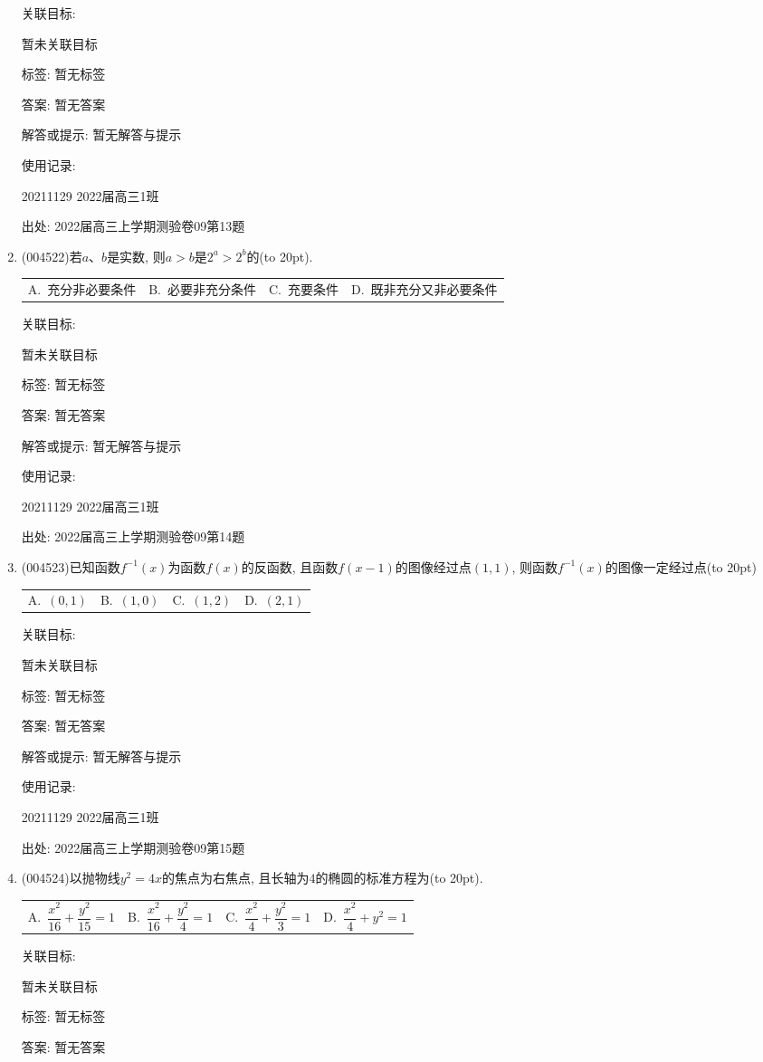 \documentclass[10pt,a4paper]{article}
\newcommand{\bracket}[1]{(\hbox to #1pt{})}
\newcommand{\fourch}[4]{\par\begin{tabular}{p{.23\textwidth}p{.23\textwidth}p{.23\textwidth}p{.23\textwidth}}
A.~#1 &B.~#2& C.~#3& D.~#4
\end{tabular}}
\begin{document}
\begin{enumerate}[1.]
关联目标:

暂未关联目标



标签: 暂无标签

答案: 暂无答案

解答或提示: 暂无解答与提示

使用记录:

20211129	2022届高三1班	


出处: 2022届高三上学期测验卷09第13题
\item { (004522)}若$a$、$b$是实数, 则$a>b$是$2^a>2^b$的\bracket{20}.
\fourch{充分非必要条件}{必要非充分条件}{充要条件}{既非充分又非必要条件}


关联目标:

暂未关联目标



标签: 暂无标签

答案: 暂无答案

解答或提示: 暂无解答与提示

使用记录:

20211129	2022届高三1班	


出处: 2022届高三上学期测验卷09第14题
\item { (004523)}已知函数$f^{-1}(x)$为函数$f(x)$的反函数, 且函数$f(x-1)$的图像经过点$(1,1)$, 则函数$f^{-1}(x)$的图像一定经过点\bracket{20}
\fourch{$(0,1)$}{$(1,0)$}{$(1,2)$}{$(2,1)$}


关联目标:

暂未关联目标



标签: 暂无标签

答案: 暂无答案

解答或提示: 暂无解答与提示

使用记录:

20211129	2022届高三1班	


出处: 2022届高三上学期测验卷09第15题
\item { (004524)}以抛物线$y^2=4x$的焦点为右焦点, 且长轴为$4$的椭圆的标准方程为\bracket{20}.
\fourch{$\dfrac{x^2}{16}+\dfrac{y^2}{15}=1$}{$\dfrac{x^2}{16}+\dfrac{y^2}4=1$}{$\dfrac{x^2}4+\dfrac{y^2}3=1$}{$\dfrac{x^2}4+{y^2}=1$}


关联目标:

暂未关联目标



标签: 暂无标签

答案: 暂无答案


\end{enumerate}
\end{document}
